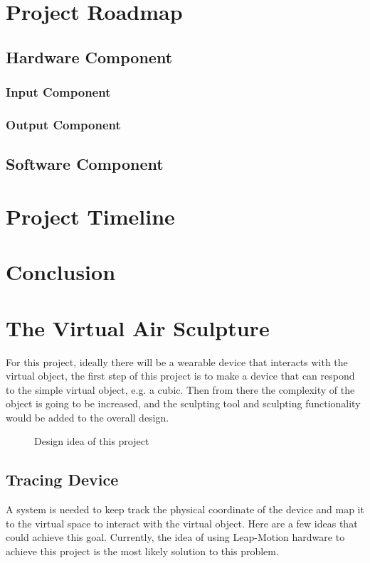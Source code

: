 \documentclass[12pt,a4paper]{report}
\begin{document}
\section{Project Roadmap}
\subsection{Hardware Component}
\subsubsection{Input Component}
\subsubsection{Output Component}
\subsection{Software Component}
\section{Project Timeline}
\section{Conclusion}

\section{The Virtual Air Sculpture}

For this project, ideally there will be a wearable device that interacts with the virtual object, the first step of this project is to make a device that can respond to the simple virtual object, e.g. a cubic. Then from there the complexity of the object is going to be increased, and the sculpting tool and sculpting functionality would be added to the overall design. 

\begin{figure}[H]
    \centering
	\caption{Design idea of this project}
	\label{fig:full}
\end{figure}

\subsection{Tracing Device}

A system is needed to keep track the physical coordinate of the device and map it to the virtual space to interact with the virtual object. Here are a few ideas that could achieve this goal. Currently, the idea of using Leap-Motion hardware to achieve this project is the most likely solution to this problem. 
\end{document}
